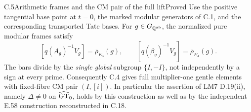 \begin{statement}{C.5}{Arithmetic frames and the CM pair of the full lift}{Proved}
Use the positive tangential base point at \(t=0\), the
marked modular generators of C.1, and the corresponding
transported Tate bases. For \(g\in G_{\mathbb Q^{\rm ab}}\),
the normalized pure modular frames satisfy
\[
 [q(A_g)^{-1}V_g]=\overline\rho_{E_3}(g),\qquad
 [q(\beta_g)^{-1}V_g]=\overline\rho_{E_4}(g).
 \tag{C.5a}
\]
The bars divide by the \emph{single global} subgroup
\(\{I,-I\}\), not independently by a sign at every prime.
Consequently C.4 gives full multiplier-one gentle
elements with fixed-fibre CM pair \((I,[i])\).
In particular the assertion of LM7 D.19(ii), namely
\(\Delta\ne0\) on \(\widehat{\rm GT}_0\), holds by this
construction as well as by the independent E.58
construction reconstructed in C.18.
\end{statement}
